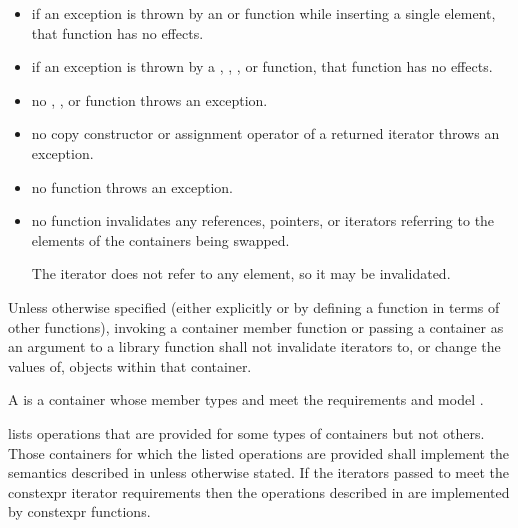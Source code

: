 \begin{itemize}
\item
if an exception is thrown by an
 or 
function while inserting a single element, that
function has no effects.
\item
if an exception is thrown by a
,
,
, or 
function, that function has no effects.
\item
no
,
,
or
function throws an exception.
\item
no copy constructor or assignment operator of a returned iterator
throws an exception.
\item
no
function throws an exception.
\item
no
function invalidates any references,
pointers, or iterators referring to the elements
of the containers being swapped.
\begin{note}
The  iterator does not refer to any element, so it may be invalidated.
\end{note}
\end{itemize}

\pnum
Unless otherwise specified (either explicitly or by defining a
function in terms of other functions), invoking a container member
function or passing a container as an argument to a library function
shall not invalidate iterators to, or change the values of, objects
within that container.

\pnum
{}%
A 
is a container
whose member types  and 
meet the
 requirements and
model .

\pnum
{} lists operations that are provided
for some types of containers but not others. Those containers for which the
listed operations are provided shall implement the semantics described in
 unless otherwise stated.
If the iterators passed to 
meet the constexpr iterator requirements
then the operations described in 
are implemented by constexpr functions.

